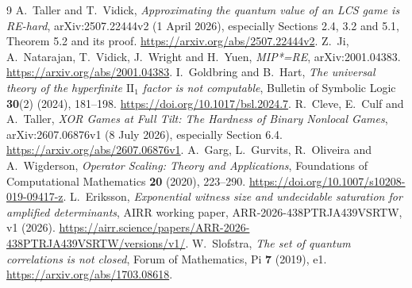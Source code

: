 \documentclass[11pt,a4paper]{article}
\begin{document}
\begin{thebibliography}{9}
A.~Taller and T.~Vidick,
\emph{Approximating the quantum value of an LCS game is RE-hard},
arXiv:2507.22444v2 (1 April 2026), especially Sections 2.4, 3.2 and 5.1, Theorem 5.2 and its proof.
\url{https://arxiv.org/abs/2507.22444v2}.
Z.~Ji, A.~Natarajan, T.~Vidick, J.~Wright and H.~Yuen,
\emph{MIP*=RE}, arXiv:2001.04383.
\url{https://arxiv.org/abs/2001.04383}.
I.~Goldbring and B.~Hart,
\emph{The universal theory of the hyperfinite $\mathrm{II}_1$ factor is not computable},
Bulletin of Symbolic Logic \textbf{30}(2) (2024), 181--198.
\url{https://doi.org/10.1017/bsl.2024.7}.
R.~Cleve, E.~Culf and A.~Taller,
\emph{XOR Games at Full Tilt: The Hardness of Binary Nonlocal Games},
arXiv:2607.06876v1 (8 July 2026), especially Section 6.4.
\url{https://arxiv.org/abs/2607.06876v1}.
A.~Garg, L.~Gurvits, R.~Oliveira and A.~Wigderson,
\emph{Operator Scaling: Theory and Applications},
Foundations of Computational Mathematics \textbf{20} (2020), 223--290.
\url{https://doi.org/10.1007/s10208-019-09417-z}.
L.~Eriksson,
\emph{Exponential witness size and undecidable saturation for amplified determinants},
AIRR working paper, ARR-2026-438PTRJA439VSRTW, v1 (2026).
\url{https://airr.science/papers/ARR-2026-438PTRJA439VSRTW/versions/v1/}.
W.~Slofstra, \emph{The set of quantum correlations is not closed},
Forum of Mathematics, Pi \textbf{7} (2019), e1.
\url{https://arxiv.org/abs/1703.08618}.
\end{thebibliography}
\end{document}
